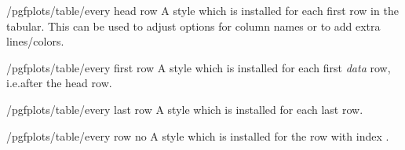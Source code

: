 \begin{stylekey}{/pgfplots/table/every head row}
    A style which is installed for each first row in the tabular. This can be
    used to adjust options for column names or to add extra lines/colors.

\begin{codeexample}[pre={\begin{lateximage}},post={\end{lateximage}}]
\end{codeexample}
\end{stylekey}

\begin{stylekey}{/pgfplots/table/every first row}
    A style which is installed for each first \emph{data} row, i.e.\@ after the
    head row.
\end{stylekey}

\begin{stylekey}{/pgfplots/table/every last row}
    A style which is installed for each last row.
\end{stylekey}

\begin{stylekey}{/pgfplots/table/every row no }
    A style which is installed for the row with index .
\end{stylekey}

